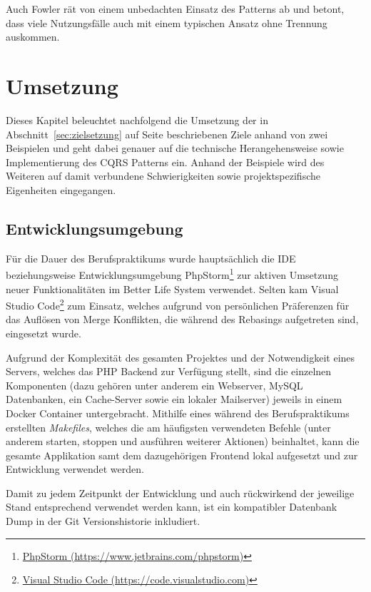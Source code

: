 \documentclass[a4paper,12pt,twoside]{scrreprt}
\begin{document}
Auch Fowler rät von einem unbedachten Einsatz des Patterns ab und betont, dass viele Nutzungsfälle auch mit einem typischen Ansatz ohne Trennung auskommen. \parencite[][]{fowler_cqrs_2011}

\chapter{Umsetzung}
\label{chap:Umsetzung}
Dieses Kapitel beleuchtet nachfolgend die Umsetzung der in Abschnitt~\ref{sec:zielsetzung} auf Seite \pageref{sec:zielsetzung} beschriebenen Ziele anhand von zwei Beispielen und geht dabei genauer auf die technische Herangehensweise sowie Implementierung des CQRS Patterns ein. Anhand der Beispiele wird des Weiteren auf damit verbundene Schwierigkeiten sowie projektspezifische Eigenheiten eingegangen.

\section{Entwicklungsumgebung}
\label{sec:entwicklungsumgebung}
Für die Dauer des Berufspraktikums wurde hauptsächlich die IDE beziehungsweise Entwicklungsumgebung PhpStorm\footnote{\href{https://www.jetbrains.com/phpstorm}{PhpStorm (https://www.jetbrains.com/phpstorm)}} zur aktiven Umsetzung neuer Funktionalitäten im Better Life System verwendet. Selten kam Visual Studio Code\footnote{\href{https://code.visualstudio.com}{Visual Studio Code (https://code.visualstudio.com)}} zum Einsatz, welches aufgrund von persönlichen Präferenzen für das Auflösen von Merge Konflikten, die während des Rebasings aufgetreten sind, eingesetzt wurde.

\smallskip

Aufgrund der Komplexität des gesamten Projektes und der Notwendigkeit eines Servers, welches das PHP Backend zur Verfügung stellt, sind die einzelnen Komponenten (dazu gehören unter anderem ein Webserver, MySQL Datenbanken, ein Cache-Server sowie ein lokaler Mailserver) jeweils in einem Docker Container untergebracht. Mithilfe eines während des Berufspraktikums erstellten \textit{Makefiles}, welches die am häufigsten verwendeten Befehle (unter anderem starten, stoppen und ausführen weiterer Aktionen) beinhaltet, kann die gesamte Applikation samt dem dazugehörigen Frontend lokal aufgesetzt und zur Entwicklung verwendet werden.

Damit zu jedem Zeitpunkt der Entwicklung und auch rückwirkend der jeweilige Stand entsprechend verwendet werden kann, ist ein kompatibler Datenbank Dump in der Git Versionshistorie inkludiert.
\end{document}
